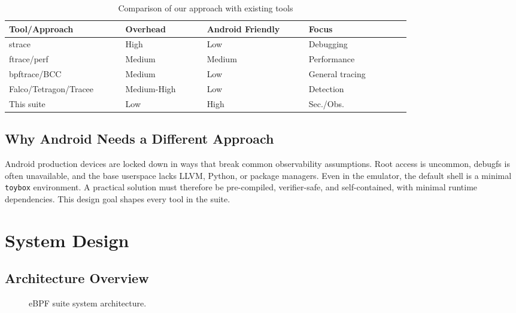 \documentclass[conference]{IEEEtran}
\begin{document}
\begin{table}[H]
  \centering
  \small
  \caption{Comparison of our approach with existing tools}
  \label{tab:comparison}
  \begin{tabular}{|p{0.22\linewidth}|p{0.16\linewidth}|p{0.20\linewidth}|p{0.20\linewidth}|}
    \hline
    \textbf{Tool/Approach} & \textbf{Overhead} & \textbf{Android Friendly} & \textbf{Focus} \\ \hline
    strace & High & Low & Debugging \\ \hline
    ftrace/perf & Medium & Medium & Performance \\ \hline
    bpftrace/BCC & Medium & Low & General tracing \\ \hline
    Falco/Tetragon/Tracee & Medium-High & Low & Detection \\ \hline
    This suite & Low & High & Sec./Obs. \\ \hline
  \end{tabular}
\end{table}

\subsection{Why Android Needs a Different Approach}
Android production devices are locked down in ways that break common observability assumptions. Root access is uncommon, debugfs is often unavailable, and the base userspace lacks LLVM, Python, or package managers. Even in the emulator, the default shell is a minimal \texttt{toybox} environment. A practical solution must therefore be pre-compiled, verifier-safe, and self-contained, with minimal runtime dependencies. This design goal shapes every tool in the suite.

\section{System Design}

\subsection{Architecture Overview}

\begin{figure}[H]
  \centering
  \caption{eBPF suite system architecture.}
  \label{fig:arch}
\end{figure}
\end{document}
